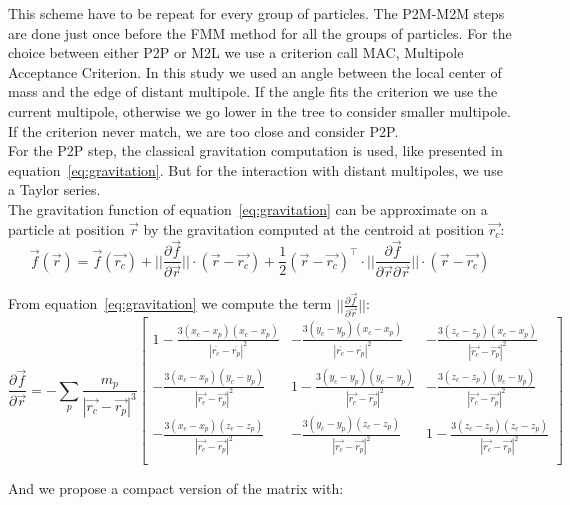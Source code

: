 This scheme have to be repeat for every group of particles. 
The P2M-M2M steps are done just once before the FMM method for all the groups of particles.
For the choice between either P2P or M2L we use a criterion call MAC, Multipole Acceptance Criterion. 	
In this study we used an angle between the local center of mass and the edge of distant multipole. 
If the angle fits the criterion we use the current multipole, otherwise we go lower in the tree to consider smaller multipole.
If the criterion never match, we are too close and consider P2P.\\

For the P2P step, the classical gravitation computation is used, like presented in equation~\ref{eq:gravitation}.
But for the interaction with distant multipoles, we use a Taylor series.\\
The gravitation function of equation~\ref{eq:gravitation} can be approximate on a particle at position $\vec{r}$ by the gravitation computed at the centroid at position $\vec{r_c}$: 
\begin{equation}
\label{eq:taylor_series}
 \vec{f}(\vec{r}) = \vec{f}(\vec{r_c}) + ||\frac{\partial\vec{f}}{\partial\vec{r}}||\cdot (\vec{r} - \vec{r_c}) + \frac{1}{2} (\vec{r}-\vec{r_c})^\intercal \cdot   ||\frac{\partial\vec{f}}{\partial\vec{r} \partial\vec{r}}|| \cdot (\vec{r} - \vec{r_c})
 \end{equation}

 From equation~\ref{eq:gravitation} we compute the term $||\frac{\partial\vec{f}}{\partial\vec{r}}||$:
 \begin{equation}
\frac{\partial\vec{f}}{\partial\vec{r}} =
- \sum_p \frac{m_p}{|\vec{r_c}-\vec{r_p}|^3}
\begin{bmatrix}
1 - \frac{3(x_c-x_p)(x_c-x_p)}{|\overline{r_c}-\overline{r_p}|^2} & -\frac{3(y_c-y_p)(x_c-x_p)}{|\overline{r_c}-\overline{r_p}|^2}  & -\frac{3(z_c-z_p)(x_c-x_p)}{|\vec{r_c}-\vec{r_p}|^2}  \\
-\frac{3(x_c-x_p)(y_c-y_p)}{|\vec{r_c}-\vec{r_p}|^2}  & 1 - \frac{3(y_c-y_p)(y_c-y_p)}{|\vec{r_c}-\vec{r_p}|^2} &  -\frac{3(z_c-z_p)(y_c-y_p)}{|\vec{r_c}-\vec{r_p}|^2}\\
- \frac{3(x_c-x_p)(z_c-z_p)}{|\vec{r_c}-\vec{r_p}|^2}   &  -\frac{3(y_c-y_p)(z_c-z_p)}{|\vec{r_c}-\vec{r_p}|^2} &  1- \frac{3(z_c-z_p)(z_c-z_p)}{|\vec{r_c}-\vec{r_p}|^2} \\
\end{bmatrix}
\end{equation}

And we propose a compact version of the matrix with: 
 
